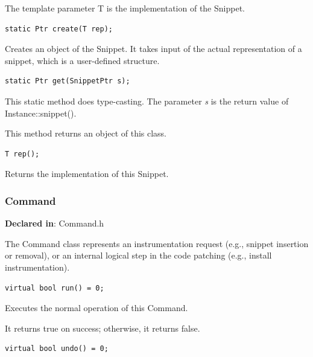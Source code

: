 \documentclass[11pt]{article}
\begin{document}
The template parameter T is the implementation of the Snippet.


\begin{verbatim}
static Ptr create(T rep);

\end{verbatim}



Creates an object of the Snippet. It takes input of the actual representation of
a snippet, which is a user-defined structure.


\begin{verbatim}
static Ptr get(SnippetPtr s);

\end{verbatim}



This static method does type-casting. The parameter \emph{s} is the return value of
Instance::snippet().

This method returns an object of this class.


\begin{verbatim}
T rep();

\end{verbatim}



Returns the implementation of this Snippet.

\subsubsection{Command}
\label{sec-3.2.3}

\textbf{Declared in}: Command.h

The Command class represents an instrumentation request (e.g., snippet insertion
or removal), or an internal logical step in the code patching (e.g., install
instrumentation).


\begin{verbatim}
virtual bool run() = 0;

\end{verbatim}



Executes the normal operation of this Command.

It returns true on success; otherwise, it returns false.


\begin{verbatim}
virtual bool undo() = 0;

\end{verbatim}
\end{document}
